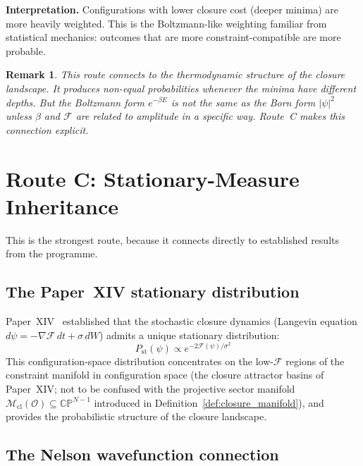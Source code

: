 \documentclass[12pt]{article}
\newtheorem{remark}[theorem]{Remark}
\newcommand{\Fcal}{\mathcal{F}}
\newcommand{\Ocal}{\mathcal{O}}
\newcommand{\Mcl}{\mathcal{M}_{\mathrm{cl}}}
\newcommand{\Pst}{P_{\mathrm{st}}}
\begin{document}
\textbf{Interpretation.} Configurations with lower closure cost (deeper minima) are more heavily weighted. This is the Boltzmann-like weighting familiar from statistical mechanics: outcomes that are more constraint-compatible are more probable.

\begin{remark}
This route connects to the thermodynamic structure of the closure landscape. It produces non-equal probabilities whenever the minima have different depths. But the Boltzmann form $e^{-\beta E}$ is not the same as the Born form $|\psi|^2$ unless $\beta$ and $\Fcal$ are related to amplitude in a specific way. Route~C makes this connection explicit.
\end{remark}

\section{Route C: Stationary-Measure Inheritance}\label{sec:stationary}

This is the strongest route, because it connects directly to established results from the programme.

\subsection{The Paper~XIV stationary distribution}

Paper~XIV~\citep{SmartXIV} established that the stochastic closure dynamics (Langevin equation $d\psi = -\nabla\Fcal\, dt + \sigma\, dW$) admits a unique stationary distribution:
\begin{equation}\label{eq:stationary}
    \Pst(\psi) \propto e^{-2\Fcal(\psi)/\sigma^2}
\end{equation}
This configuration-space distribution concentrates on the low-$\Fcal$ regions of the constraint manifold in configuration space (the closure attractor basins of Paper~XIV; not to be confused with the projective sector manifold $\Mcl(\Ocal) \subseteq \mathbb{CP}^{N-1}$ introduced in Definition~\ref{def:closure_manifold}), and provides the probabilistic structure of the closure landscape.

\subsection{The Nelson wavefunction connection}
\end{document}

